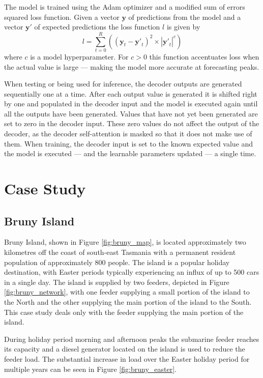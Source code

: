 \documentclass[conference]{IEEEtran}
\begin{document}
The model is trained using the Adam optimizer \cite{Kingma2014} and a modified sum of errors squared loss function.
Given a vector $\boldsymbol{y}$ of predictions from the model and a vector $\boldsymbol{y'}$ of expected predictions the loss function $l$ is given by 
\begin{equation}
l = \sum_{t=0}^{R}((\boldsymbol{y}_t - \boldsymbol{y'}_t)^2 \times |\boldsymbol{y'}_t|^c)
\end{equation}
where $c$ is a model hyperparameter.
For $c>0$ this function accentuates loss when the actual value is large --- making the model more accurate at forecasting peaks.

When testing or being used for inference, the decoder outputs are generated sequentially one at a time.
After each output value is generated it is shifted right by one and populated in the decoder input and the model is executed again until all the outputs have been generated.
Values that have not yet been generated are set to zero in the decoder input.
These zero values do not affect the output of the decoder, as the decoder self-attention is masked so that it does not make use of them.
When training, the decoder input is set to the known expected value and the model is executed --- and the learnable parameters updated --- a single time.


\section{Case Study}

\subsection{Bruny Island}
Bruny Island, shown in Figure \ref{fig:bruny_map}, is located approximately two kilometres off the coast of south-east Tasmania with a permanent resident population of approximately 800 people.
The island is a popular holiday destination, with Easter periods typically experiencing an influx of up to 500 cars in a single day.
The island is supplied by two feeders, depicted in Figure \ref{fig:bruny_network}, with  one feeder supplying a small portion of the island to the North and the other supplying the main portion of the island to the South.
This case study deals only with the feeder supplying the main portion of the island.

During holiday period morning and afternoon peaks the submarine feeder reaches its capacity and a diesel generator located on the island is used to reduce the feeder load.
The substantial increase in load over the Easter holiday period for multiple years can be seen in Figure \ref{fig:bruny_easter}.
\end{document}
